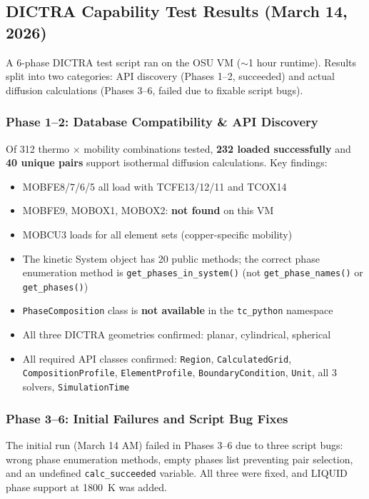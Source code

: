 \documentclass[11pt]{article}
\begin{document}
\subsection{DICTRA Capability Test Results (March 14, 2026)}

A 6-phase DICTRA test script ran on the OSU VM ($\sim$1 hour runtime). Results split into two categories: API discovery (Phases 1--2, succeeded) and actual diffusion calculations (Phases 3--6, failed due to fixable script bugs).

\subsubsection{Phase 1--2: Database Compatibility \& API Discovery}

Of 312 thermo $\times$ mobility combinations tested, \textbf{232 loaded successfully} and \textbf{40 unique pairs} support isothermal diffusion calculations. Key findings:

\begin{itemize}[leftmargin=*]
    \item MOBFE8/7/6/5 all load with TCFE13/12/11 and TCOX14
    \item MOBFE9, MOBOX1, MOBOX2: \textbf{not found} on this VM
    \item MOBCU3 loads for all element sets (copper-specific mobility)
    \item The kinetic System object has 20 public methods; the correct phase enumeration method is \texttt{get\_phases\_in\_system()} (not \texttt{get\_phase\_names()} or \texttt{get\_phases()})
    \item \texttt{PhaseComposition} class is \textbf{not available} in the \texttt{tc\_python} namespace
    \item All three DICTRA geometries confirmed: planar, cylindrical, spherical
    \item All required API classes confirmed: \texttt{Region}, \texttt{CalculatedGrid}, \texttt{CompositionProfile}, \texttt{ElementProfile}, \texttt{BoundaryCondition}, \texttt{Unit}, all 3 solvers, \texttt{SimulationTime}
\end{itemize}

\subsubsection{Phase 3--6: Initial Failures and Script Bug Fixes}

The initial run (March 14 AM) failed in Phases 3--6 due to three script bugs: wrong phase enumeration methods, empty phases list preventing pair selection, and an undefined \texttt{calc\_succeeded} variable. All three were fixed, and LIQUID phase support at \SI{1800}{\kelvin} was added.
\end{document}
